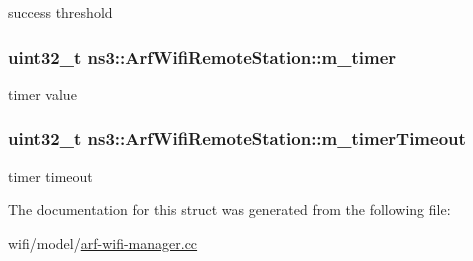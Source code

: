 success threshold 

\subsubsection[{\texorpdfstring{m\+\_\+timer}{m_timer}}]{\setlength{\rightskip}{0pt plus 5cm}uint32\+\_\+t ns3\+::\+Arf\+Wifi\+Remote\+Station\+::m\+\_\+timer}\hypertarget{structns3_1_1ArfWifiRemoteStation_a14623ad40579f150f8b7e98c83208ce7}{}\label{structns3_1_1ArfWifiRemoteStation_a14623ad40579f150f8b7e98c83208ce7}


timer value 

\subsubsection[{\texorpdfstring{m\+\_\+timer\+Timeout}{m_timerTimeout}}]{\setlength{\rightskip}{0pt plus 5cm}uint32\+\_\+t ns3\+::\+Arf\+Wifi\+Remote\+Station\+::m\+\_\+timer\+Timeout}\hypertarget{structns3_1_1ArfWifiRemoteStation_a9d215b79b4d6e566c2269b3c0f9807fc}{}\label{structns3_1_1ArfWifiRemoteStation_a9d215b79b4d6e566c2269b3c0f9807fc}


timer timeout 



The documentation for this struct was generated from the following file\+:\begin{DoxyCompactItemize}
\item 
wifi/model/\hyperlink{arf-wifi-manager_8cc}{arf-\/wifi-\/manager.\+cc}\end{DoxyCompactItemize}
